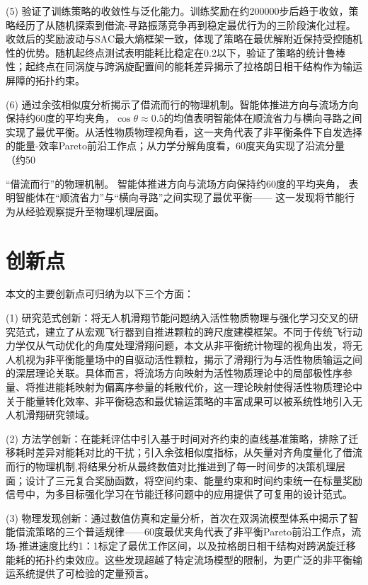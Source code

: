(5) 验证了训练策略的收敛性与泛化能力。训练奖励在约200000步后趋于收敛，策略经历了从随机探索到借流-寻路振荡竞争再到稳定最优行为的三阶段演化过程。收敛后的奖励波动与SAC最大熵框架一致，体现了策略在最优解附近保持受控随机性的优势。随机起终点测试表明能耗比稳定在0.2以下，验证了策略的统计鲁棒性；起终点在同涡旋与跨涡旋配置间的能耗差异揭示了拉格朗日相干结构作为输运屏障的拓扑约束。



(6) 通过余弦相似度分析揭示了借流而行的物理机制。智能体推进方向与流场方向保持约60度的平均夹角，$\cos\theta \approx 0.5$的均值表明智能体在顺流省力与横向寻路之间实现了最优平衡。从活性物质物理视角看，这一夹角代表了非平衡条件下自发选择的能量-效率Pareto前沿工作点；从力学分解角度看，60度夹角实现了沿流分量（约50%

“借流而行”的物理机制。
智能体推进方向与流场方向保持约60度的平均夹角，
表明智能体在“顺流省力”与“横向寻路”之间实现了最优平衡——
这一发现将节能行为从经验观察提升至物理机理层面。

\section{创新点}

本文的主要创新点可归纳为以下三个方面：

(1) 研究范式创新：将无人机滑翔节能问题纳入活性物质物理与强化学习交叉的研究范式，建立了从宏观飞行器到自推进颗粒的跨尺度建模框架。不同于传统飞行动力学仅从气动优化的角度处理滑翔问题，本文从非平衡统计物理的视角出发，将无人机视为非平衡能量场中的自驱动活性颗粒，揭示了滑翔行为与活性物质输运之间的深层理论关联。具体而言，将流场方向映射为活性物质理论中的局部极性序参量、将推进能耗映射为偏离序参量的耗散代价，这一理论映射使得活性物质理论中关于能量转化效率、非平衡稳态和最优输运策略的丰富成果可以被系统性地引入无人机滑翔研究领域。

(2) 方法学创新：在能耗评估中引入基于时间对齐约束的直线基准策略，排除了迁移耗时差异对能耗对比的干扰；引入余弦相似度指标，从矢量对齐角度量化了借流而行的物理机制,将结果分析从最终数值对比推进到了每一时间步的决策机理层面；设计了三元复合奖励函数，将空间约束、能量约束和时间约束统一在标量奖励信号中，为多目标强化学习在节能迁移问题中的应用提供了可复用的设计范式。

(3) 物理发现创新：通过数值仿真和定量分析，首次在双涡流模型体系中揭示了智能借流策略的三个普适规律——60度最优夹角代表了非平衡Pareto前沿工作点，流场-推进速度比约1：1标定了最优工作区间，以及拉格朗日相干结构对跨涡旋迁移能耗的拓扑约束效应。这些发现超越了特定流场模型的限制，为更广泛的非平衡输运系统提供了可检验的定量预言。






